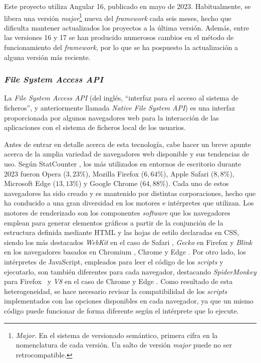Este proyecto utiliza Angular 16, publicado en mayo de 2023. Habitualmente, se libera una versión \textit{major}\footnote{\textit{Major}. En el sistema de versionado semántico\footnotemark, primera cifra en la nomenclatura de cada versión. Un salto de versión \textit{major} puede no ser retrocompatible.} nueva del \textit{framework} cada seis meses, hecho que dificulta mantener actualizados los proyectos a la última versión. Además, entre las versiones 16 y 17 se han producido numerosos cambios en el método de funcionamiento del \textit{framework}, por lo que se ha pospuesto la actualización a alguna versión más reciente.

\subsubsection{\textit{File System Access API}}
\label{subsec:tecFSA}
La \textit{File System Access API} (del inglés, ``interfaz para el acceso al sistema de ficheros'', y anteriormente llamada \textit{Native File System API}) es una interfaz proporcionada por algunos navegadores web para la interacción de las aplicaciones con el sistema de ficheros local de los usuarios.

Antes de entrar en detalle acerca de esta tecnología, cabe hacer un breve apunte acerca de la amplia variedad de navegadores web disponible y sus tendencias de uso. Según StatCounter \cite{UsoNavegadores}, los más utilizados en entornos de escritorio durante 2023 fueron Opera ($3,23\%$), Mozilla Firefox ($6,64\%$), Apple Safari ($8,8\%$), Microsoft Edge ($13,13\%$) y Google Chrome ($64,88\%$). Cada uno de estos navegadores ha sido creado y es mantenido por distintas corporaciones, hecho que ha conducido a una gran diversidad en los motores e intérpretes que utilizan. Los motores de renderizado son los componentes \textit{software} que los navegadores emplean para generar elementos gráficos a partir de la conjunción de la estructura definida mediante HTML y las hojas de estilo declaradas en CSS, siendo los más destacados \textit{WebKit} en el caso de Safari \cite{WebKit}, \textit{Gecko} en Firefox \cite{Gecko} y \textit{Blink} en los navegadores basados en Chromium \cite{Chromium}, Chrome y Edge \cite{Blink,EdgeChromium}. Por otro lado, los intérpretes de JavaScript, empleados para leer el código de los \textit{scripts} y ejecutarlo, son también diferentes para cada navegador, destacando \textit{SpiderMonkey} para Firefox \cite{SpiderMonkey} y \textit{V8} en el caso de Chrome y Edge \cite{V8}. Como resultado de esta heterogeneidad, se hace necesario revisar la compatibilidad de los \textit{scripts} implementados con las opciones disponibles en cada navegador, ya que un mismo código puede funcionar de forma diferente según el intérprete que lo ejecute.

